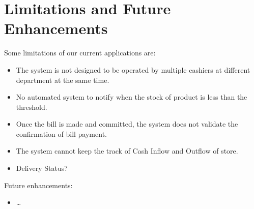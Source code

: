 \section{Limitations and Future Enhancements}

Some limitations of our current applications are:
\begin{itemize}[topsep=0pt]
  \item The system is not designed to be operated by multiple cashiers at
    different department at the same time.
  \item No automated system to notify when the stock of product is less than
    the threshold.
  \item Once the bill is made and committed, the system does not validate the
    confirmation of bill payment.
  \item The system cannot keep the track of Cash Inflow and Outflow of store.
  \item Delivery Status?
\end{itemize}

Future enhancements:
\begin{itemize}[topsep=0pt]
  \item \ldots
\end{itemize}
